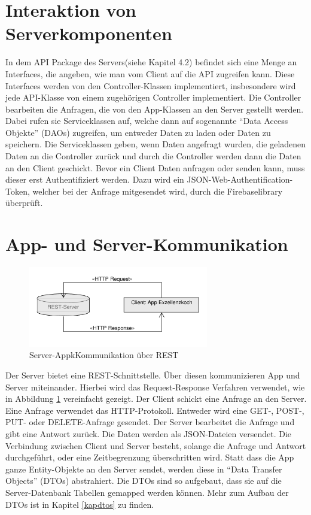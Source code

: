 \section{Interaktion von Serverkomponenten}

In dem API Package des Servers(siehe Kapitel 4.2) befindet sich eine Menge an Interfaces, die angeben, wie man vom Client auf die API zugreifen kann. Diese Interfaces werden von den Controller-Klassen implementiert, insbesondere wird jede API-Klasse von einem zugehörigen Controller implementiert. 
Die Controller bearbeiten die Anfragen, die von den App-Klassen an den Server gestellt werden. Dabei rufen sie Serviceklassen auf, welche dann auf sogenannte "`Data Access Objekte"' (DAOs) zugreifen, um entweder Daten zu laden oder Daten zu speichern. Die Serviceklassen geben, wenn Daten angefragt wurden, die geladenen Daten an die Controller zurück und durch die Controller werden dann die Daten an den Client geschickt.
Bevor ein Client Daten anfragen oder senden kann, muss dieser erst Authentifiziert werden. Dazu wird ein JSON-Web-Authentification-Token, welcher bei der Anfrage mitgesendet wird, durch die Firebaselibrary überprüft.


\section{App- und Server-Kommunikation}

\begin{figure}[H]
\centering
\includegraphics[width=0.7\textwidth]{pics/ServerAppRESTInteraction.pdf}%
\caption{Server-AppkKommunikation über REST}%
\label{rest}%
\end{figure}

Der Server bietet eine REST-Schnittstelle. Über diesen kommunizieren App und Server miteinander.
Hierbei wird das Request-Response Verfahren verwendet, wie in Abbildung \ref{rest} vereinfacht gezeigt. Der Client schickt eine Anfrage an den Server. Eine Anfrage verwendet das HTTP-Protokoll. Entweder wird eine GET-, POST-, PUT- oder DELETE-Anfrage gesendet. Der Server bearbeitet die Anfrage und gibt eine Antwort zurück. Die Daten werden als JSON-Dateien versendet. Die Verbindung zwischen Client und Server besteht, solange die Anfrage und Antwort durchgeführt, oder eine Zeitbegrenzung überschritten wird. 
Statt dass die App ganze Entity-Objekte an den Server sendet, werden diese in "`Data Transfer Objects"' (DTOs) abstrahiert. Die DTOs sind so aufgebaut, dass sie auf die Server-Datenbank Tabellen gemapped werden können. Mehr zum Aufbau der DTOs ist in Kapitel \ref{kapdtos} zu finden.

